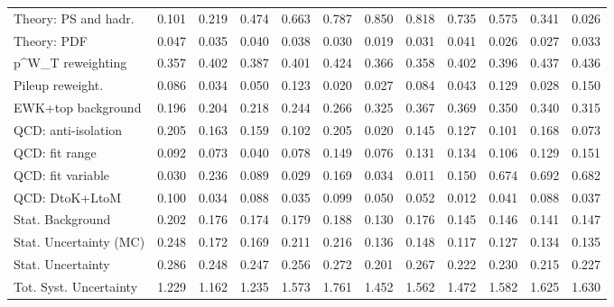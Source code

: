 \begin{tabular}{l|p{0.6cm}p{0.6cm}p{0.6cm}p{0.6cm}p{0.6cm}p{0.6cm}p{0.6cm}p{0.6cm}p{0.6cm}p{0.6cm}p{0.6cm}}
Theory: PS and hadr.                     & 0.101 & 0.219 & 0.474 & 0.663 & 0.787 & 0.850 & 0.818 & 0.735 & 0.575 & 0.341 & 0.026 \\
Theory: PDF                              & 0.047 & 0.035 & 0.040 & 0.038 & 0.030 & 0.019 & 0.031 & 0.041 & 0.026 & 0.027 & 0.033 \\
p^{W}_{T} reweighting                    & 0.357 & 0.402 & 0.387 & 0.401 & 0.424 & 0.366 & 0.358 & 0.402 & 0.396 & 0.437 & 0.436 \\
Pileup reweight.                         & 0.086 & 0.034 & 0.050 & 0.123 & 0.020 & 0.027 & 0.084 & 0.043 & 0.129 & 0.028 & 0.150 \\
EWK+top background                       & 0.196 & 0.204 & 0.218 & 0.244 & 0.266 & 0.325 & 0.367 & 0.369 & 0.350 & 0.340 & 0.315 \\
QCD: anti-isolation                      & 0.205 & 0.163 & 0.159 & 0.102 & 0.205 & 0.020 & 0.145 & 0.127 & 0.101 & 0.168 & 0.073 \\
QCD: fit range                           & 0.092 & 0.073 & 0.040 & 0.078 & 0.149 & 0.076 & 0.131 & 0.134 & 0.106 & 0.129 & 0.151 \\
QCD: fit variable                        & 0.030 & 0.236 & 0.089 & 0.029 & 0.169 & 0.034 & 0.011 & 0.150 & 0.674 & 0.692 & 0.682 \\
QCD: DtoK+LtoM                           & 0.100 & 0.034 & 0.088 & 0.035 & 0.099 & 0.050 & 0.052 & 0.012 & 0.041 & 0.088 & 0.037 \\
Stat. Background                         & 0.202 & 0.176 & 0.174 & 0.179 & 0.188 & 0.130 & 0.176 & 0.145 & 0.146 & 0.141 & 0.147 \\
Stat. Uncertainty (MC)                   & 0.248 & 0.172 & 0.169 & 0.211 & 0.216 & 0.136 & 0.148 & 0.117 & 0.127 & 0.134 & 0.135 \\
\hline
Stat. Uncertainty                        & 0.286 & 0.248 & 0.247 & 0.256 & 0.272 & 0.201 & 0.267 & 0.222 & 0.230 & 0.215 & 0.227 \\
\hline
Tot. Syst. Uncertainty                   & 1.229 & 1.162 & 1.235 & 1.573 & 1.761 & 1.452 & 1.562 & 1.472 & 1.582 & 1.625 & 1.630 \\
\hline
\end{tabular}
